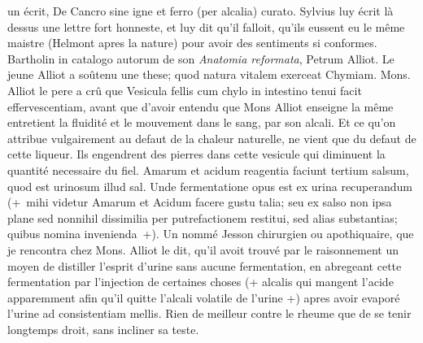 un \'{e}crit, De Cancro sine igne et ferro (per alcalia) curato. Sylvius\protect{} luy \'{e}crit l\`{a} dessus une lettre fort honneste, et luy dit qu'il falloit, qu'ils eussent eu le m\^{e}me maistre (Helmont\protect{} apres la nature) pour avoir des sentiments si conformes.
%
Bartholin\protect{} in catalogo autorum de son \textit{Anatomia reformata},
 
Petrum Alliot.\protect{}
%
Le jeune Alliot\protect{} a so\^{u}tenu une these; quod natura vitalem exerceat Chymiam. Mons. Alliot le pere\protect{} a cr\^{u} que Vesicula fellis cum chylo in intestino tenui facit effervescentiam, avant que d'avoir entendu que Mons Alliot\protect{} enseigne la m\^{e}me
entretient la fluidit\'{e} et le mouvement dans le sang, par son alcali. Et ce qu'on attribue vulgairement au defaut de la chaleur naturelle, ne vient que du defaut de cette liqueur. Ils engendrent des pierres dans cette vesicule qui diminuent la quantit\'{e} necessaire du fiel. Amarum et acidum reagentia faciunt tertium salsum, quod est urinosum illud sal. Unde fermentatione opus est
 ex urina recuperandum
(+~mihi videtur Amarum et Acidum facere
gustu talia; seu ex salso non ipsa plane sed nonnihil dissimilia per putrefactionem restitui, sed alias substantias; quibus nomina invenienda~+).
Un nomm\'{e} Jesson\protect{} chirurgien ou apothiquaire, que je rencontra chez Mons. Alliot\protect{} le
dit, qu'il avoit trouv\'{e} par le raisonnement un moyen de distiller l'esprit d'urine
 sans aucune fermentation, en abregeant cette fermentation par l'injection de certaines choses (+ alcalis qui mangent l'acide apparemment afin qu'il quitte l'alcali volatile de l'urine +) apres avoir evapor\'{e} l'urine ad consistentiam mellis.
\pend%
\pstart%
Rien de meilleur contre le rheume
que de se tenir longtemps droit, sans incliner sa teste.%
\pend%
\count{}
\count{}
\count{}
